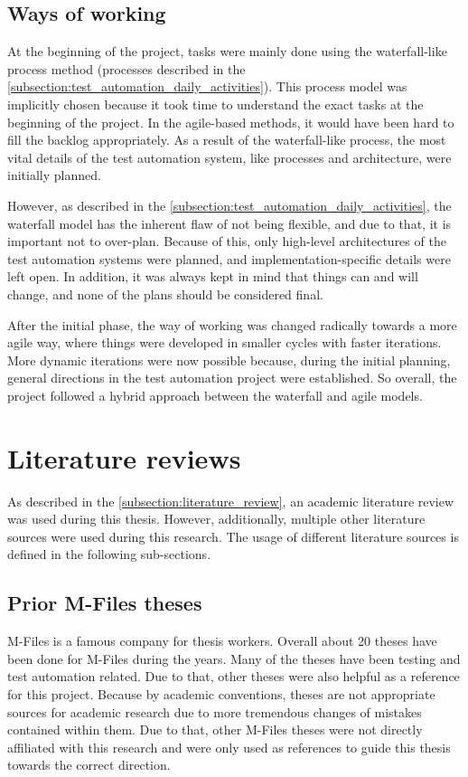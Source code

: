 \subsection{Ways of working}\label{subsection:ways_of_working}
At the beginning of the project, tasks were mainly done using the waterfall-like process method (processes described in the \autoref{subsection:test_automation_daily_activities}). This process model was implicitly chosen because it took time to understand the exact tasks at the beginning of the project. In the agile-based methods, it would have been hard to fill the backlog appropriately. As a result of the waterfall-like process, the most vital details of the test automation system, like processes and architecture, were initially planned.

However, as described in the \autoref{subsection:test_automation_daily_activities}, the waterfall model has the inherent flaw of not being flexible, and due to that, it is important not to over-plan. Because of this, only high-level architectures of the test automation systems were planned, and implementation-specific details were left open. In addition, it was always kept in mind that things can and will change, and none of the plans should be considered final.

After the initial phase, the way of working was changed radically towards a more agile way, where things were developed in smaller cycles with faster iterations. More dynamic iterations were now possible because, during the initial planning, general directions in the test automation project were established. So overall, the project followed a hybrid approach between the waterfall and agile models.

\section{Literature reviews}\label{chapter:literature_reviews}
As described in the \autoref{subsection:literature_review}, an academic literature review was used during this thesis. However, additionally, multiple other literature sources were used during this research. The usage of different literature sources is defined in the following sub-sections.

\subsection{Prior M-Files theses}
M-Files is a famous company for thesis workers. Overall about 20 theses have been done for M-Files during the years. Many of the theses have been testing and test automation related. Due to that, other theses were also helpful as a reference for this project. Because by academic conventions, theses are not appropriate sources for academic research due to more tremendous changes of mistakes contained within them. Due to that, other M-Files theses were not directly affiliated with this research and were only used as references to guide this thesis towards the correct direction.

